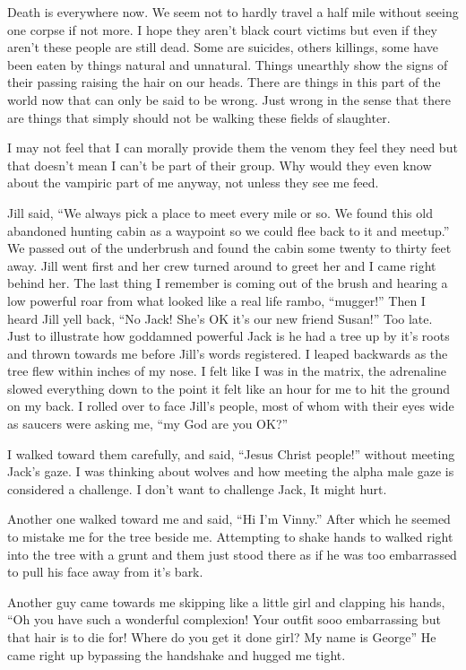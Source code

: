 Death is everywhere now. We seem not to hardly travel a half mile without seeing one corpse if not more. I hope they aren't black court victims but even if they aren't these people are still dead. Some are suicides, others killings, some have been eaten by things natural and unnatural. Things unearthly show the signs of their passing raising the hair on our heads. There are things in this part of the world now that can only be said to be wrong. Just wrong in the sense that there are things that simply should not be walking these fields of slaughter. 

I may not feel that I can morally provide them the venom they feel they need but that doesn't mean I can't be part of their group. Why would they even know about the vampiric part of me anyway, not unless they see me feed. 

Jill said, ``We always pick a place to meet every mile or so. We found this old abandoned hunting cabin as a waypoint so we could flee back to it and meetup.'' We passed out of the underbrush and found the cabin some twenty to thirty feet away. Jill went first and her crew turned around to greet her and I came right behind her. The last thing I remember is coming out of the brush and hearing a low powerful roar from what looked like a real life rambo, ``mugger!'' Then I heard Jill yell back, ``No Jack! She's OK it's our new friend Susan!'' Too late. Just to illustrate how goddamned powerful Jack is he had a tree up by it's roots and thrown towards me before Jill's words registered. I leaped backwards as the tree flew within inches of my nose. I felt like I was in the matrix, the adrenaline slowed everything down to the point it felt like an hour for me to hit the ground on my back. I rolled over to face Jill's people, most of whom with their eyes wide as saucers were asking me, ``my God are you OK?''

I walked toward them carefully, and said, ``Jesus Christ people!'' without meeting Jack's gaze. I was thinking about wolves and how meeting the alpha male gaze is considered a challenge. I don't want to challenge Jack, It might hurt.

Another one walked toward me and said, ``Hi I'm Vinny.'' After which he seemed to mistake me for the tree beside me. Attempting to shake hands to walked right into the tree with a grunt and them just stood there as if he was too embarrassed to pull his face away from it's bark.

Another guy came towards me skipping like a little girl and clapping his hands, ``Oh you have such a wonderful complexion! Your outfit sooo embarrassing but that hair is to die for! Where do you get it done girl? My name is George'' He came right up bypassing the handshake and hugged me tight.

